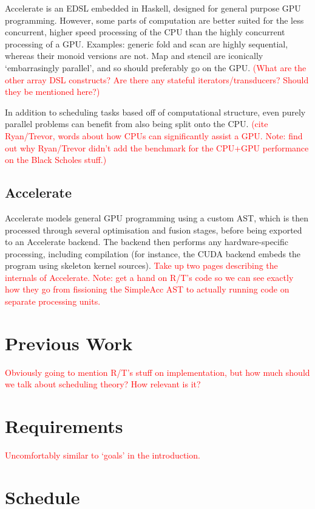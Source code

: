 \documentclass[a4paper,12pt]{article}
\newcommand{\red}[1]{\textcolor{red}{#1}}
\begin{document}
\begin{multicols*}{2}
Accelerate is an EDSL embedded in Haskell, designed for general purpose GPU programming. 
However, some parts of computation are better suited for the less concurrent, higher speed processing of the CPU than the highly concurrent processing of a GPU. 
Examples: generic fold and scan are highly sequential, whereas their monoid versions are not. 
Map and stencil are iconically `embarrasingly parallel', and so should preferably go on the GPU. 
\red{(What are the other array DSL constructs? Are there any stateful iterators/transducers? Should they be mentioned here?)}

In addition to scheduling tasks based off of computational structure, even purely parallel problems can benefit from also being split onto the CPU. \red{(cite Ryan/Trevor, words about how CPUs can significantly assist a GPU. 
Note: find out why Ryan/Trevor didn't add the benchmark for the CPU+GPU performance on the Black Scholes stuff.)}

\subsection{Accelerate}

Accelerate models general GPU programming using a custom AST, which is then processed through several optimisation and fusion stages, before being exported to an Accelerate backend. 
The backend then performs any hardware-specific processing, including compilation (for instance, the CUDA backend embeds the program using skeleton kernel sources).
\red{Take up two pages describing the internals of Accelerate. Note: get a hand on R/T's code so we can see exactly how they go from fissioning the SimpleAcc AST to actually running code on separate processing units.}


\section{Previous Work}

\red{Obviously going to mention R/T's stuff on implementation, but how much should we talk about scheduling theory? How relevant is it?}


\section{Requirements}

\red{Uncomfortably similar to `goals' in the introduction.}


\section{Schedule}


\end{multicols*}
\end{document}
